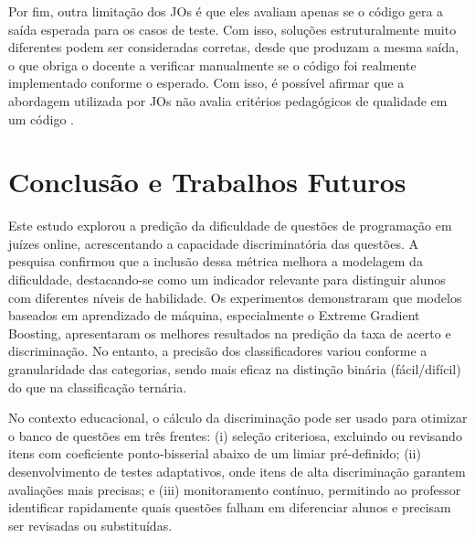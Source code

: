 \documentclass[12pt]{article}
\begin{document}
Por fim, outra limitação dos JOs é que eles avaliam apenas se o código gera a saída esperada para os casos de teste. Com isso, soluções estruturalmente muito diferentes podem ser consideradas corretas, desde que produzam a mesma saída, o que obriga o docente a verificar manualmente se o código foi realmente implementado conforme o esperado. %
Com isso, é possível afirmar que a abordagem utilizada por JOs não avalia critérios pedagógicos de qualidade em um código \cite{francisco-UEFS-2025}.

\section{Conclusão e Trabalhos Futuros} \label{sec:conclusao}

Este estudo explorou a predição da dificuldade de questões de programação em juízes online, acrescentando a capacidade discriminatória das questões. A pesquisa confirmou que a inclusão dessa métrica melhora a modelagem da dificuldade, destacando-se como um indicador relevante para distinguir alunos com diferentes níveis de habilidade. Os experimentos demonstraram que modelos baseados em aprendizado de máquina, especialmente o Extreme Gradient Boosting, apresentaram os melhores resultados na predição da taxa de acerto e discriminação. No entanto, a precisão dos classificadores variou conforme a granularidade das categorias, sendo mais eficaz na distinção binária (fácil/difícil) do que na classificação ternária.

No contexto educacional, o cálculo da discriminação pode ser usado para otimizar o banco de questões em três frentes: (i) seleção criteriosa, excluindo ou revisando itens com coeficiente ponto‑bisserial abaixo de um limiar pré-definido; (ii) desenvolvimento de testes adaptativos, onde itens de alta discriminação garantem avaliações mais precisas; e (iii) monitoramento contínuo, permitindo ao professor identificar rapidamente quais questões falham em diferenciar alunos e precisam ser revisadas ou substituídas.
\end{document}
